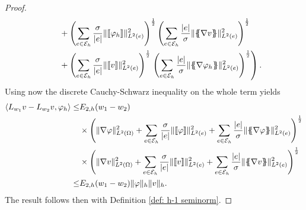 \begin{proof}
\begin{align*}
			&\phantom{\times \;\;\;}+ \left( \sum_{e \in \edges} \frac {\sigma}{|e|}\LTwonormE{\jump {\varphi_h}}^2 \right)^{\frac 1 2}
			\left( \sum_{e \in \edges} \frac {|e|} \sigma\LTwonormE{\average{\nabla v}}^2 \right)^{\frac 1 2} \\
			&\phantom {\times \;\;\;}+ \left( \sum_{e \in \edges} \frac {\sigma}{|e|}\LTwonormE{\jump v}^2 \right)^{\frac 1 2}
			\left. \left( \sum_{e \in \edges} \frac {|e|} \sigma\LTwonormE{\average{\nabla \varphi_h}}^2 \right)^{\frac 1 2} \right).
	\end{align*}
	Using now the discrete Cauchy-Schwarz inequality on the whole term yields
	\begin{align*}
		\bilin{L_{w_1}v- L_{w_2} v} {\varphi_h} 
		\leq& \epsilonTwo{w_1 - w_2} \\
		  & \times 
			\left( 
				\LTwonorm{\nabla \varphi}^2
					+ \sum\limits_{e \in \edges} \frac {\sigma} {|e|}\LTwonormE{\jump {\varphi}}^2
					+ \sum\limits_{e \in \edges} \frac {|e|} \sigma \LTwonormE{\average{\nabla \varphi}}^2
				\right)^{\frac 1 2} \nonumber \\
			&\times
			\left( 
				\LTwonorm{\nabla v}^2
					+\sum\limits_{e \in \edges} \frac {\sigma}{|e|}\LTwonormE{\jump {v}}^2
					+ \sum\limits_{e \in \edges} \frac {|e|} \sigma \LTwonormE{\average{\nabla v}}^2
			\right) ^{\frac 1 2} \nonumber \\
			\leq & \epsilonTwo{w_1 - w_2} \eNorm \varphi \eNorm v.
	\end{align*}
	The result follows then with Definition \ref{def: h-1 seminorm}.

\end{proof}
